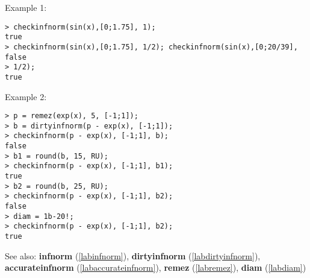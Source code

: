 \noindent Example 1: 
\begin{center}\begin{minipage}{15cm}\begin{Verbatim}[frame=single]
> checkinfnorm(sin(x),[0;1.75], 1);
true
> checkinfnorm(sin(x),[0;1.75], 1/2); checkinfnorm(sin(x),[0;20/39],
false
> 1/2);
true
\end{Verbatim}
\end{minipage}\end{center}
\noindent Example 2: 
\begin{center}\begin{minipage}{15cm}\begin{Verbatim}[frame=single]
> p = remez(exp(x), 5, [-1;1]);
> b = dirtyinfnorm(p - exp(x), [-1;1]);
> checkinfnorm(p - exp(x), [-1;1], b);
false
> b1 = round(b, 15, RU);
> checkinfnorm(p - exp(x), [-1;1], b1);
true
> b2 = round(b, 25, RU);
> checkinfnorm(p - exp(x), [-1;1], b2);
false
> diam = 1b-20!;
> checkinfnorm(p - exp(x), [-1;1], b2);
true
\end{Verbatim}
\end{minipage}\end{center}
See also: \textbf{infnorm} (\ref{labinfnorm}), \textbf{dirtyinfnorm} (\ref{labdirtyinfnorm}), \textbf{accurateinfnorm} (\ref{labaccurateinfnorm}), \textbf{remez} (\ref{labremez}), \textbf{diam} (\ref{labdiam})
